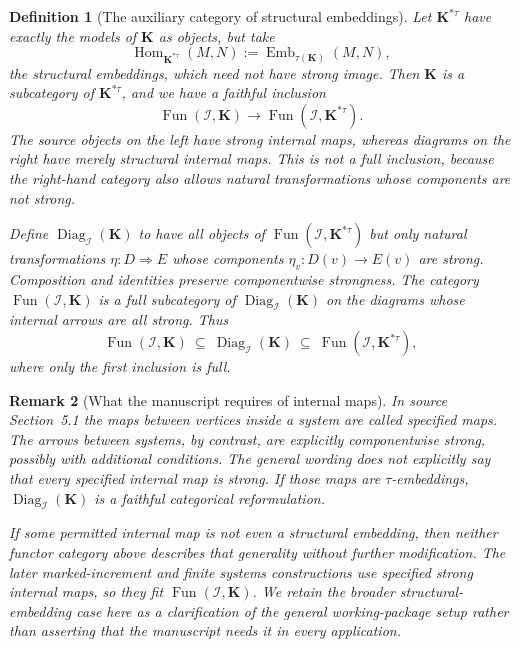 \documentclass[11pt]{article}
\newcommand{\K}{\mathbf K}
\theoremstyle{plain}
\newtheorem{definition}{Definition}[section]
\newtheorem{remark}[definition]{Remark}
\begin{document}
\begin{definition}[The auxiliary category of structural embeddings]
\label{def:star-tau}
Let $\K^{*\tau}$ have exactly the models of
$\K$ as objects, but take
\[
\operatorname{Hom}_{\K^{*\tau}}(M,N)
:=\operatorname{Emb}_{\tau(\K)}(M,N),
\]
the \emph{structural} embeddings, which need
not have strong image. Then $\K$ is a
subcategory of $\K^{*\tau}$, and we have
a faithful inclusion
\[
\operatorname{Fun}(\mathcal I,\K)
\longrightarrow
\operatorname{Fun}(\mathcal I,\K^{*\tau}).
\]
The source objects on the left have strong
internal maps, whereas diagrams on the right
have merely structural internal maps.
This is \emph{not a full inclusion},
because the right-hand category also
allows natural transformations whose
components are not strong.

Define $\operatorname{Diag}_{\mathcal I}(\K)$
to have all objects of
$\operatorname{Fun}(\mathcal I,\K^{*\tau})$
but only natural transformations
$\eta:D\Rightarrow E$ whose components
$\eta_v:D(v)\to E(v)$ are \emph{strong}.
Composition and identities preserve
componentwise strongness.
The category $\operatorname{Fun}(\mathcal I,\K)$
is a full subcategory of
$\operatorname{Diag}_{\mathcal I}(\K)$
on the diagrams whose \emph{internal}
arrows are all strong. Thus
\[
\operatorname{Fun}(\mathcal I,\K)
\ \subseteq\
\operatorname{Diag}_{\mathcal I}(\K)
\ \subseteq\
\operatorname{Fun}(\mathcal I,\K^{*\tau}),
\]
where only the first inclusion is full.
\end{definition}

\begin{remark}[What the manuscript requires of internal maps]
In source Section~5.1 the maps \emph{between
vertices inside a system} are called
\emph{specified maps}. The arrows \emph{between
systems}, by contrast, are explicitly
componentwise strong, possibly with additional
conditions. The general wording does not
explicitly say that every specified internal
map is strong. If those maps are $\tau$-embeddings,
$\operatorname{Diag}_{\mathcal I}(\K)$ is a
faithful categorical reformulation.

If some permitted internal map is not even
a structural embedding, then neither
functor category above describes that
generality without further modification.
The later marked-increment and finite
systems constructions use specified
strong internal maps, so they fit
$\operatorname{Fun}(\mathcal I,\K)$.
We retain the broader structural-embedding
case here as a clarification of the general
working-package setup rather than asserting
that the manuscript needs it in every application.
\end{remark}
\end{document}
